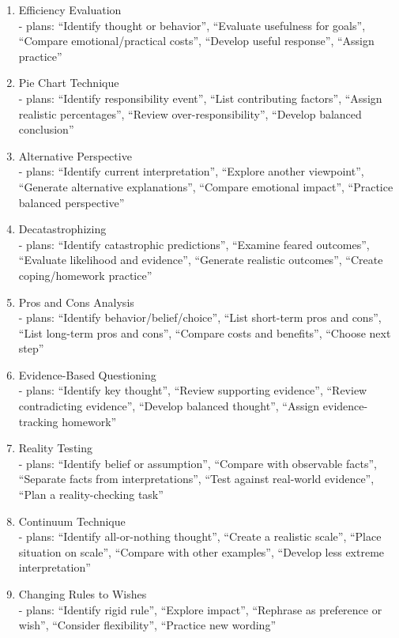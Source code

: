 \begin{tcolorbox}[
    breakable,
    colback=gray!10,
    colframe=gray!40,
    boxrule=0.5pt,
    arc=3mm,
    left=4mm, right=4mm, top=3mm, bottom=3mm
]
\begin{enumerate}[itemsep=4pt,parsep=0pt,topsep=2pt]
    \item Efficiency Evaluation\\
    - plans: ``Identify thought or behavior'', ``Evaluate usefulness for goals'', ``Compare emotional/practical costs'', ``Develop useful response'', ``Assign practice''
    \item Pie Chart Technique\\
    - plans: ``Identify responsibility event'', ``List contributing factors'', ``Assign realistic percentages'', ``Review over-responsibility'', ``Develop balanced conclusion''
    \item Alternative Perspective\\
    - plans: ``Identify current interpretation'', ``Explore another viewpoint'', ``Generate alternative explanations'', ``Compare emotional impact'', ``Practice balanced perspective''
    \item Decatastrophizing\\
    - plans: ``Identify catastrophic predictions'', ``Examine feared outcomes'', ``Evaluate likelihood and evidence'', ``Generate realistic outcomes'', ``Create coping/homework practice''
    \item Pros and Cons Analysis\\
    - plans: ``Identify behavior/belief/choice'', ``List short-term pros and cons'', ``List long-term pros and cons'', ``Compare costs and benefits'', ``Choose next step''
    \item Evidence-Based Questioning\\
    - plans: ``Identify key thought'', ``Review supporting evidence'', ``Review contradicting evidence'', ``Develop balanced thought'', ``Assign evidence-tracking homework''
    \item Reality Testing\\
    - plans: ``Identify belief or assumption'', ``Compare with observable facts'', ``Separate facts from interpretations'', ``Test against real-world evidence'', ``Plan a reality-checking task''
    \item Continuum Technique\\
    - plans: ``Identify all-or-nothing thought'', ``Create a realistic scale'', ``Place situation on scale'', ``Compare with other examples'', ``Develop less extreme interpretation''
    \item Changing Rules to Wishes\\
    - plans: ``Identify rigid rule'', ``Explore impact'', ``Rephrase as preference or wish'', ``Consider flexibility'', ``Practice new wording''

\end{enumerate}
\end{tcolorbox}
